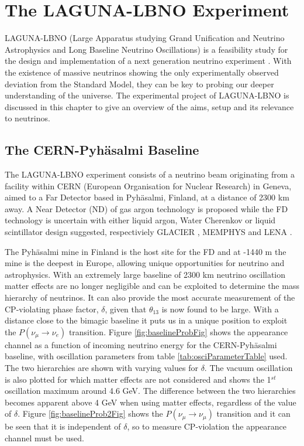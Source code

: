 \chapter{The LAGUNA-LBNO Experiment}
LAGUNA-LBNO (Large Apparatus studying Grand Unification and Neutrino Astrophysics and Long Baseline Neutrino Oscillations) is a feasibility study for the design and implementation of  a next generation neutrino experiment \cite{laguna1}. With the existence of massive neutrinos showing the only experimentally observed deviation from the Standard Model, they can be key to probing our deeper understanding of the universe. The experimental project of LAGUNA-LBNO is discussed in this chapter to give an overview of the aims, setup and its relevance to neutrinos. 

\section{The CERN-Pyh\"{a}salmi Baseline}
The LAGUNA-LBNO experiment consists of a neutrino beam originating from a facility within CERN (European Organisation for Nuclear Research) in Geneva, aimed to a Far Detector based in Pyh\"{a}salmi, Finland, at a distance of 2300 km away. A Near Detector (ND) of gas argon technology is proposed while the FD technology is uncertain with either liquid argon, Water Cherenkov or liquid scintillator design suggested, respectiviely GLACIER \cite{GLACIER}, MEMPHYS \cite{MEMPHYS} and LENA \cite{LENA}.

The Pyh\"{a}salmi mine in Finland is the host site for the FD and at -1440 m the mine is the deepest in Europe, allowing unique opportunities for neutrino and astrophysics. With an extremely large baseline of 2300 km neutrino oscillation matter effects are no longer negligible and can be exploited to determine the mass hierarchy of neutrinos. It can also provide the most accurate measurement of the CP-violating phase factor, $\delta$, given that $\theta_{13}$ is now found to be large. With a distance close to the bimagic baseline\cite{magicBaseline1} it puts us in a unique position to exploit the $P(\nu_{\mu} \to \nu_{e})$ transition. Figure \ref{fig:baselineProbFig} shows the appearance channel as a function of incoming neutrino energy for the CERN-Pyh\"asalmi baseline, with oscillation parameters from table \ref{tab:osciParameterTable} used. The two hierarchies are shown with varying values for $\delta$. The vacuum oscillation is also plotted for which matter effects are not considered and shows the 1$^{st}$ oscillation maximum around 4.6 GeV. The difference between the two hierarchies becomes apparent above 4 GeV when using matter effects, regardless of the value of $\delta$. Figure \ref{fig:baselineProb2Fig} shows the $P(\nu_{\mu} \to \nu_{\mu})$ transition and it can be seen that it is independent of $\delta$, so to measure CP-violation the appearance channel must be used. 

